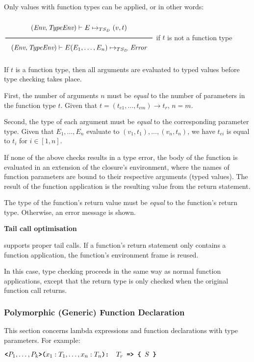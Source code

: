 Only values with function types can be applied, or in other words:

\begin{center}
    $\Rule{ (\textit{Env}, \textit{TypeEnv}) \vdash E \Eval (v, t)}{ (\textit{Env}, \textit{TypeEnv}) \vdash E(E_1, \dots, E_n) \Eval \textit{Error} }$ 
    if $t$ is not a function type
\end{center}

If $t$ is a function type, then all arguments are evaluated to typed values before type checking takes place.

First, the number of arguments $n$ must be \textit{equal} to the number of parameters in the function type $t$.
Given that $t = (t_{e1}, \dots, t_{em}) \rightarrow t_r$, $n = m$.

Second, the type of each argument must be \textit{equal} to the corresponding parameter type.
Given that $E_1, \dots, E_n$ evaluate to $(v_1, t_1), \dots, (v_n, t_n)$, we have $t_{ei}$ is equal to $t_i$ for $i \in [1, n]$.

If none of the above checks results in a type error, the body of the function is evaluated in an extension of the closure's environment, where the names of function parameters are bound to their respective arguments (typed values).
The result of the function application is the resulting value from the return statement.

The type of the function's return value must be \textit{equal} to the function's return type. 
Otherwise, an error message is shown.

\vspace{1em}
\textbf{Tail call optimisation}

\DynamicTS{} supports proper tail calls. 
If a function's return statement only contains a function application, the function's environment frame is reused.

In this case, type checking proceeds in the same way as normal function applications, except that the return type is only checked when the original function call returns.

\subsubsection*{Polymorphic (Generic) Function Declaration}
\label{generics1}

This section concerns lambda expressions and function declarations with type parameters.
For example:

\begin{center}
    $\textbf{\texttt{<}} P_1, \dots, P_k \textbf{\texttt{>(}} x_1: T_1, \dots, x_n: T_n \textbf{\texttt{): }} T_r \textbf{\texttt{ => \{ }} S \textbf{\texttt{ \} }}  $
\end{center}

